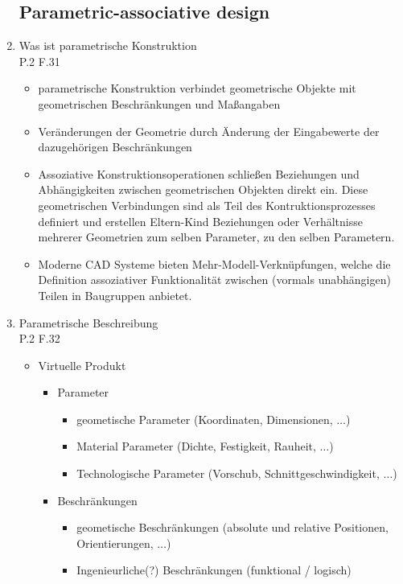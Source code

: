 \documentclass[10pt,a4paper,fleqn]{article}
\begin{document}
\begin{enumerate}
\subsection{Parametric-associative design}
	 \item Was ist parametrische Konstruktion\\
	 	P.2 F.31
	 	\begin{itemize}
	 		\item parametrische Konstruktion verbindet geometrische Objekte mit geometrischen Beschränkungen und Maßangaben
	 		\item Veränderungen der Geometrie durch Änderung der Eingabewerte der dazugehörigen Beschränkungen
	 		\item Assoziative Konstruktionsoperationen schließen Beziehungen und Abhängigkeiten zwischen geometrischen Objekten direkt ein. Diese geometrischen Verbindungen sind als Teil des Kontruktionsprozesses definiert und erstellen Eltern-Kind Beziehungen oder Verhältnisse mehrerer Geometrien zum selben Parameter, zu den selben Parametern.
	 		\item Moderne CAD Systeme bieten Mehr-Modell-Verknüpfungen, welche die Definition assoziativer Funktionalität zwischen (vormals unabhängigen) Teilen in Baugruppen anbietet.
	 	\end{itemize}
\pagebreak
	 \item Parametrische Beschreibung\\
	 	P.2 F.32
	 	\begin{itemize}
	 		\item Virtuelle Produkt
	 			\begin{itemize}
	 				\item Parameter
	 					\begin{itemize}
	 						\item geometische Parameter (Koordinaten, Dimensionen, $\dots$)
	 						\item Material Parameter (Dichte, Festigkeit, Rauheit, $\dots$)
	 						\item Technologische Parameter (Vorschub, Schnittgeschwindigkeit, $\dots$)
	 					\end{itemize}
	 				\item Beschränkungen
	 					\begin{itemize}
	 						\item geometische Beschränkungen (absolute und relative Positionen, Orientierungen, $\dots$)
	 						\item Ingenieurliche(?) Beschränkungen (funktional / logisch)
	 					\end{itemize}

\end{itemize}
\end{itemize}
\end{enumerate}
\end{document}
